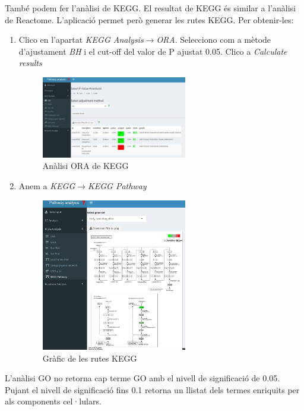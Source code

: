 També podem fer l'anàlisi de KEGG. El resultat de KEGG és similar a l'anàlisi de Reactome. L'aplicació permet però generar les rutes KEGG. Per obtenir-les:

\begin{enumerate}
\item Clico en l'apartat \textit{KEGG Analysis}$\rightarrow$\textit{ORA}. Selecciono com a mètode d'ajustament \textit{BH} i el cut-off del valor de P ajustat 0.05. Clico a \textit{Calculate results}
\begin{figure}[H]
\centering
\includegraphics[width=0.6\textwidth]{figures/Estudi1_Fig11_ORA_KEGG.png} 
\caption{Anàlisi \gls{ORA} de \gls{KEGG}}
\end{figure}

\item Anem a \textit{KEGG}$\rightarrow$\textit{\gls{KEGG Pathway}}
\begin{figure}[H]
\centering
\includegraphics[width=0.6\textwidth]{figures/Estudi1_Fig12_KEGG_Pathway.png} 
\caption{Gràfic de les rutes \gls{KEGG}}
\end{figure}
\end{enumerate}

L'anàlisi GO no retorna cap terme GO amb el nivell de significació de 0.05. Pujant el nivell de significació fins 0.1 retorna un llistat dels termes enriquits per als components cel·lulars.

